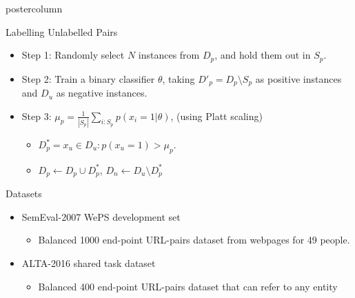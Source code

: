 \documentclass{beamer}
\begin{document}
\begin{frame}
\begin{columns}
\begin{column}{.5\textwidth}
\begin{beamercolorbox}[center]{postercolumn}
\begin{minipage}{.98\textwidth}
{\begin{block}{Labelling Unlabelled Pairs}
\begin{itemize}
\item Step 1: Randomly select $N$ instances from $D_{p}$, and hold them out in $S_{p}$.
	\vspace{0.5em}
\item Step 2: Train a binary classifier $\theta$, taking $D'_{p} = D_p \setminus S_p$ as positive instances and $D_{u}$ as negative instances. 
	\vspace{0.5em}
\item Step 3: \mbox{$\mu_{p} = \frac{1}{|S_{p}|}\sum_{i:S_{p}} p(x_{i}=1 | \theta)$,} (using Platt scaling)
	\vspace{0.5em}
\begin{itemize}
\item $D_p^* = {x_u \in D_u: p(x_{u}=1) > \mu_{p}}$.
	\vspace{0.5em}
\item $D_{p} \leftarrow D_{p} \cup D_{p}^*$, $D_{n} \leftarrow D_{u} \setminus D_{p}^*$
\vfill
\end{itemize}
              \end{itemize}
\vspace{0.5em}
            \end{block}
            \vfill
					
	\begin{myblock}{Datasets}
        \begin{itemize}
        \item SemEval-2007 WePS development set 
	\begin{itemize}
		\item Balanced 1000 end-point URL-pairs dataset from webpages for 49 people. 
	\end{itemize}	
	\vspace{0.5em}
	\item ALTA-2016 shared task dataset
	 	\begin{itemize}
		\item Balanced 400 end-point URL-pairs dataset that can refer to any entity 
	      \end{itemize}
          \end{itemize}
        \end{myblock} \vfill

}
\end{minipage}
\end{beamercolorbox}
\end{column}
\end{columns}
\end{frame}
\end{document}
